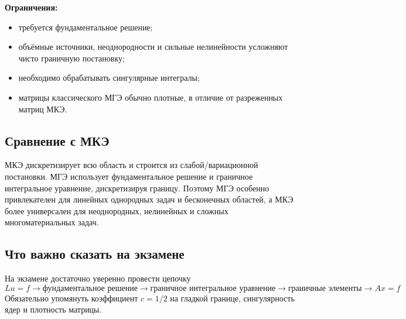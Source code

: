 \textbf{Ограничения:}
\begin{itemize}
\item требуется фундаментальное решение;
\item объёмные источники, неоднородности и сильные нелинейности усложняют чисто граничную постановку;
\item необходимо обрабатывать сингулярные интегралы;
\item матрицы классического МГЭ обычно плотные, в отличие от разреженных матриц МКЭ.
\end{itemize}

\subsection{Сравнение с МКЭ}

МКЭ дискретизирует всю область и строится из слабой/вариационной постановки. МГЭ использует фундаментальное решение и граничное интегральное уравнение, дискретизируя границу. Поэтому МГЭ особенно привлекателен для линейных однородных задач и бесконечных областей, а МКЭ более универсален для неоднородных, нелинейных и сложных многоматериальных задач.

\subsection{Что важно сказать на экзамене}

На экзамене достаточно уверенно провести цепочку
\[
\boxed{
Lu=f
\rightarrow
\text{фундаментальное решение}
\rightarrow
\text{граничное интегральное уравнение}
\rightarrow
\text{граничные элементы}
\rightarrow
Ax=f}.
\]
Обязательно упомянуть коэффициент $c=1/2$ на гладкой границе, сингулярность ядер и плотность матрицы.

\newpage
